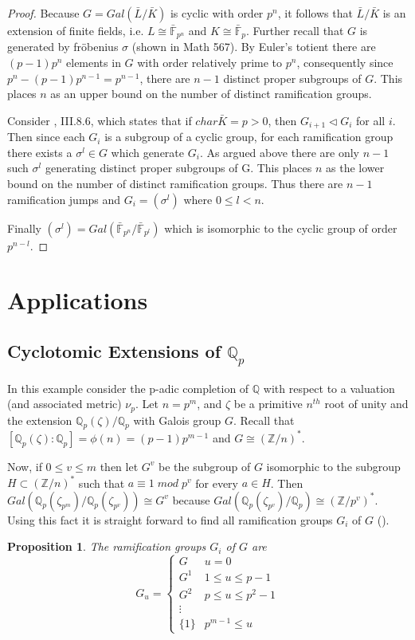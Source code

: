 \documentclass[paper=a4, fontsize=11pt]{scrartcl} %
\numberwithin{equation}{section} %
\numberwithin{figure}{section} %
\numberwithin{table}{section} %
\theoremstyle{break}
\newtheorem{prop}{Proposition}
\begin{document}
\begin{proof}
 Because $G=Gal(\bar{L}/\bar{K})$ is cyclic with order $p^n$, it follows that $\bar{L}/\bar{K}$ is an extension of finite fields, i.e. $L\cong \bar{\mathbb{F}}_{p^n}$ and $K\cong \bar{\mathbb{F}}_p$. Further recall that $G$ is generated by fr\"{o}benius $\sigma$ (shown in Math 567). By Euler's totient there are $(p-1)p^n$ elements in $G$ with order relatively prime to $p^n$, consequently since $p^n-(p-1)p^{n-1}=p^{n-1}$, there are $n-1$ distinct proper subgroups of $G$. This places $n$ as an upper bound on the number of distinct ramification groups.

Consider \cite{stitchenoth}, III.8.6, which states that if $char{\bar{K}} =p>0$, then $G_{i+1} \triangleleft G_i$ for all $i$. Then since each $G_i$ is a subgroup of a cyclic group, for each ramification group there exists a $\sigma^l\in G$ which generate $G_i$. As argued above there are only $n-1$ such $\sigma^{l}$ generating distinct proper subgroups of G. This places $n$ as the lower bound on the number of distinct ramification groups. Thus there are $n-1$ ramification jumps and $G_i = (\sigma^l)$ where $0 \leq l < n$.

Finally $(\sigma^l)=Gal(\bar{\mathbb{F}}_{p^n}/\bar{\mathbb{F}}_{p^l})$ which is isomorphic to the cyclic group of order $p^{n-l}$.
\end{proof}

\section{Applications}
\subsection{Cyclotomic Extensions of $\mathbb{Q}_p$}
In this example consider the p-adic completion of $\mathbb{Q}$ with respect to a valuation (and associated metric) $\nu_p$. Let $n=p^m$, and $\zeta$ be a primitive $n^{th}$ root of unity and the extension $\mathbb{Q}_p(\zeta)/\mathbb{Q}_p$ with Galois group $G$. Recall that $[\mathbb{Q}_p(\zeta):\mathbb{Q}_p]=\phi(n)=(p-1)p^{m-1}$ and $G\cong (\mathbb{Z}/n)^*$. 

Now, if $0 \leq v \leq m$ then let $G^v$ be the subgroup of $G$ isomorphic to the subgroup $H \subset (\mathbb{Z}/n)^*$ such that $a \equiv 1\;mod\;p^v$ for every $a\in H$. Then $Gal(\mathbb{Q}_p(\zeta_{p^m})/\mathbb{Q}_p(\zeta_{p^v})) \cong G^v$ because $Gal(\mathbb{Q}_p(\zeta_{p^v})/\mathbb{Q}_p) \cong (\mathbb{Z}/p^v)^*$. Using this fact it is straight forward to find all ramification groups $G_i$ of $G$ (\cite{Serre}).
\begin{prop}
The ramification groups $G_i$ of $G$ are
\[ G_u = \begin{cases} 
      G    & u=0 \\
      G^1  & 1 \leq u \leq p -1 \\
      G^2  & p \leq u \leq p^2 -1\\
      \vdots \\
      \{1\} & p^{m-1} \leq u
   \end{cases}
\]
\end{prop}
\end{document}

